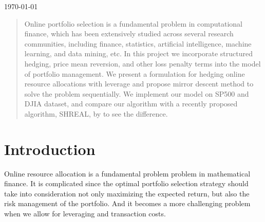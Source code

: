 \begin{titlepage}


{\large \today}\\[2cm] %


 

\vfill %

\end{titlepage}

\onehalfspacing
\begin{abstract}
Online portfolio selection is a fundamental problem in computational finance, which has been extensively studied across several research communities, including finance, statistics, artificial intelligence, machine learning, and data mining, etc.
In this project we incorporate structured hedging, price mean reversion, and other loss penalty terms into the model of portfolio management. We present a formulation for hedging online resource allocations with leverage and propose mirror descent method to solve the problem sequentially. We implement our model on SP500 and DJIA dataset, and compare our algorithm with a recently proposed algorithm, SHREAL, by \cite{johnson2015structured} to see the difference.
\end{abstract}


\section{Introduction}

Online resource allocation is a fundamental problem problem in mathematical finance. It is complicated since the optimal portfolio selection
strategy should take into consideration not only maximizing the expected return, but also the risk management of the portfolio. And it becomes a more challenging problem when we allow for leveraging and transaction costs.\\

